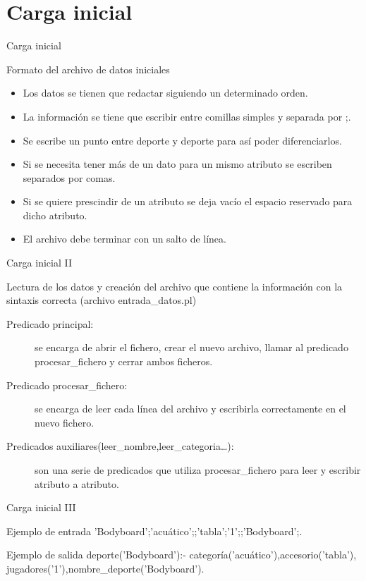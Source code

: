 \section{Carga inicial}

\begin{frame}{Carga inicial}
 \begin{block}{Formato del archivo de datos iniciales}
 \begin{itemize}
  \item Los datos se tienen que redactar siguiendo un determinado orden.
  \item La información se tiene que escribir entre comillas simples y separada por ;.
  \item Se escribe un punto entre deporte y deporte para así poder diferenciarlos.
  \item Si se necesita tener más de un dato para un mismo atributo se escriben separados por comas.
  \item Si se quiere prescindir de un atributo se deja vacío el espacio reservado para dicho atributo.
  \item El archivo debe terminar con un salto de línea.
 \end{itemize}
 \end{block}
\end{frame}

\begin{frame}{Carga inicial II}
 \begin{block}{Lectura de los datos y creación del archivo que contiene la información con la sintaxis correcta (archivo entrada\_datos.pl)}
 \begin{description}
  \item [Predicado principal:]se encarga de abrir el fichero, crear el nuevo archivo, llamar al predicado procesar\_fichero y cerrar ambos ficheros.
  \item [Predicado procesar\_fichero:]se encarga de leer cada línea del archivo y escribirla correctamente en el nuevo fichero.
  \item [Predicados auxiliares(leer\_nombre,leer\_categoria\ldots):]son una serie de predicados que utiliza procesar\_fichero para leer y escribir atributo a atributo.
 \end{description}
 \end{block}
\end{frame}

\begin{frame}{Carga inicial III}
 \begin{block}{Ejemplo de entrada}
'Bodyboard';'acuático';;'tabla';'1';;'Bodyboard';.
 \end{block}

 \begin{block}{Ejemplo de salida}
deporte('Bodyboard'):- categoría('acuático'),accesorio('tabla'),
		jugadores('1'),nombre\_deporte('Bodyboard').
 \end{block}
\end{frame}


